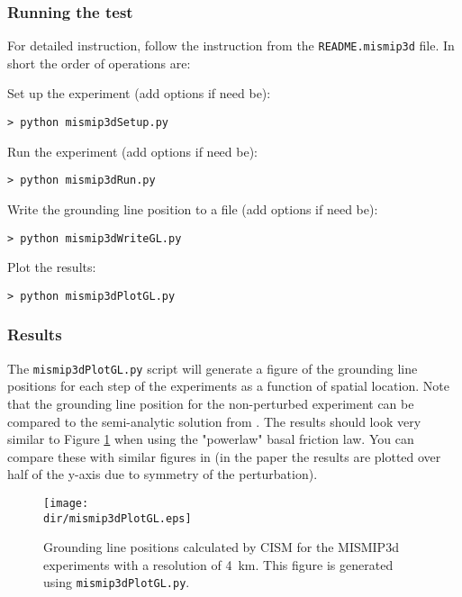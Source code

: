 \subsubsection{Running the test}
For detailed instruction, follow the instruction from the \texttt{README.mismip3d} file. In short the order of operations are:

\noindent  
Set up the experiment (add options if need be):

\texttt{> python mismip3dSetup.py}

\noindent
Run the experiment (add options if need be):

\texttt{> python mismip3dRun.py}

\noindent
Write the grounding line position to a file (add options if need be):

\texttt{> python mismip3dWriteGL.py}

\noindent
Plot the results:

\texttt{> python mismip3dPlotGL.py}


\subsubsection{Results}
The \texttt{mismip3dPlotGL.py} script will generate a figure of the grounding line positions for each step of the experiments as a function of spatial location. Note that the grounding line position for the non-perturbed experiment can be compared to the semi-analytic solution from \citet{Schoof2007}.
The results should look very similar to Figure \ref{fig:mismip3d} when using the "powerlaw" \citep{Schoof2007} basal friction law. You can compare these with similar figures in \citet{Pattyn2013} (in the paper the results are plotted over half of the y-axis due to symmetry of the perturbation).

\begin{figure}[H]
	\centering
	\texttt{[image: \\dir/mismip3dPlotGL.eps]}
	\caption{Grounding line positions calculated by CISM for the MISMIP3d experiments with a resolution of 4~km. This figure is generated using \texttt{mismip3dPlotGL.py}.}
	\label{fig:mismip3d}
\end{figure}



